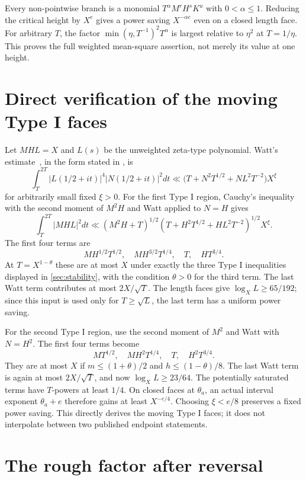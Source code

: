 Every non-pointwise branch is a monomial $T^\alpha M^rH^sK^u$
with $0<\alpha\le1$. Reducing the critical height by $X^e$
gives a power saving $X^{-\alpha e}$ even on a closed length face.
For arbitrary $T$, the factor
$\min(\eta,T^{-1})^2T^\alpha$ is largest relative to $\eta^2$
at $T=1/\eta$. This proves the full weighted mean-square assertion,
not merely its value at one height.

\section{Direct verification of the moving Type I faces}\label{app:watt}

Let $MHL=X$ and $L(s)$ be the unweighted zeta-type polynomial.
Watt's estimate~\cite{Watt}, in the form stated in
\cite[Lemma 4.1]{LiIII}, is
\[
 \int_T^{2T}|L(1/2+it)|^4|N(1/2+it)|^2dt
 \ll\bigl(T+N^2T^{1/2}+NL^2T^{-2}\bigr)X^\xi
\]
for arbitrarily small fixed $\xi>0$.
For the first Type I region, Cauchy's inequality with the second
moment of $M^2H$ and Watt applied to $N=H$ gives
\[
 \int_T^{2T}|MHL|^2dt
 \ll(M^2H+T)^{1/2}
        (T+H^2T^{1/2}+HL^2T^{-2})^{1/2}X^\xi.
\]
The first four terms are
\[
 MH^{1/2}T^{1/2},\quad MH^{3/2}T^{1/4},\quad T,\quad HT^{3/4}.
\]
At $T=X^{1-\theta}$ these are at most $X$ under exactly the
three Type I inequalities displayed in \cref{sec:stability},
with the condition $\theta>0$ for the third term.
The last Watt term contributes at most $2X/\sqrt T$.
The length faces give $\log_X L\ge65/192$; since this input is
used only for $T\ge\sqrt L$, the last term has a uniform power saving.

For the second Type I region, use the second moment of $M^2$ and
Watt with $N=H^2$. The first four terms become
\[
 MT^{1/2},\quad MH^2T^{1/4},\quad T,\quad H^2T^{3/4}.
\]
They are at most $X$ if
$m\le(1+\theta)/2$ and $h\le(1-\theta)/8$.
The last Watt term is again at most $2X/\sqrt T$, and now
$\log_XL\ge23/64$.
The potentially saturated terms have $T$-powers at least $1/4$.
On closed faces at $\theta_a$, an actual interval exponent
$\theta_a+e$ therefore gains at least $X^{-e/4}$.
Choosing $\xi<e/8$ preserves a fixed power saving. This directly
derives the moving Type I faces; it does not interpolate between
two published endpoint statements.

\section{The rough factor after reversal}\label{app:beta}

